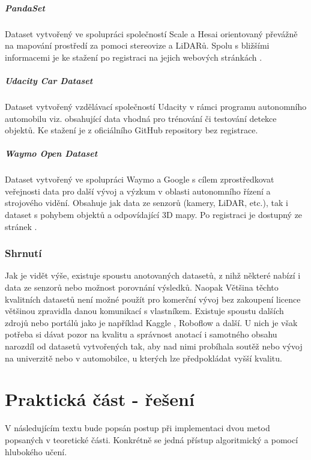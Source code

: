 \documentclass[czech, bc, kky, he, iso690numb]{fasthesis}
\begin{document}
  			\paragraph{PandaSet}
  				Dataset vytvořený ve spolupráci společností Scale a Hesai orientovaný převážně na mapování prostředí za pomoci stereovize a LiDARů. Spolu s bližšími informacemi je ke stažení po registraci na jejich webových stránkách \cite{dataset_Pandaset}.
  			\paragraph{Udacity Car Dataset}
  				Dataset vytvořený vzdělávací společností Udacity v rámci programu autonomního automobilu viz. \cite{dataset_Udacity_project} obsahující data vhodná pro trénování či testování detekce objektů. Ke stažení je z oficiálního GitHub repository \cite{dataset_Udacity} bez registrace.
  			\paragraph{Waymo Open Dataset}
  				Dataset vytvořený ve spolupráci Waymo a Google s cílem zprostředkovat veřejnosti data pro další vývoj a výzkum v oblasti autonomního řízení a strojového vidění. Obsahuje jak data ze senzorů (kamery, LiDAR, etc.), tak i dataset s pohybem objektů a odpovídající 3D mapy. Po registraci je dostupný ze stránek \cite{dataset_Waymo}.
  			\subsection{Shrnutí}
  				Jak je vidět výše, existuje spoustu anotovaných datasetů, z nihž některé nabízí i data ze senzorů nebo možnost porovnání výsledků. Naopak Většina těchto kvalitních datasetů není možné použít pro komerční vývoj bez zakoupení licence většinou zpravidla danou komunikací s vlastníkem. Existuje spoustu dalších zdrojů nebo portálů jako je například Kaggle \cite{Kaggle}, Roboflow \cite{Roboflow} a další. U nich je však potřeba si dávat pozor na kvalitu a správnost anotací i samotného obsahu narozdíl od datasetů vytvořených tak, aby nad nimi probíhala soutěž nebo vývoj na univerzitě nebo v automobilce, u kterých lze předpokládat vyšší kvalitu.
    \chapter{Praktická část - řešení}
        V následujícím textu bude popsán postup při implementaci dvou metod popsaných v teoretické části. Konkrétně se jedná přístup algoritmický a pomocí hlubokého učení.
\end{document}
